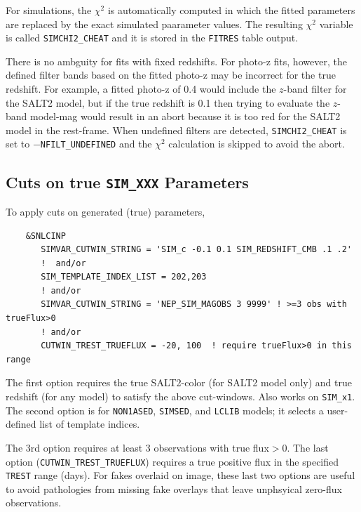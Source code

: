 \documentclass[12pt]{article}
\begin{document}
For simulations, the $\chi^2$ is automatically computed
in which the fitted parameters are replaced by the 
exact simulated paarameter values. The resulting $\chi^2$ variable
is called {\tt SIMCHI2\_CHEAT} and it is stored in the 
{\tt FITRES} table output.

There is no ambguity for fits with fixed redshifts.
For photo-z fits, however, the defined filter bands based
on the fitted photo-z may be incorrect for the true redshift.
For example, a fitted photo-z of 0.4 would include the
$z$-band filter for the SALT2 model, 
but if the true redshift is 0.1 then trying to evaluate
the $z$-band model-mag would result in an abort because
it is too red for the SALT2 model in the rest-frame.
When undefined filters are detected,
{\tt SIMCHI2\_CHEAT}  is set to $-${\tt NFILT\_UNDEFINED}
and the $\chi^2$ calculation is skipped to avoid the abort.


\subsection{Cuts on true {\tt SIM\_XXX} Parameters}
\label{subsec:SIMVAR_CUTS}

To apply cuts on generated (true) parameters,
\begin{verbatim}
    &SNLCINP
       SIMVAR_CUTWIN_STRING = 'SIM_c -0.1 0.1 SIM_REDSHIFT_CMB .1 .2'
       !  and/or
       SIM_TEMPLATE_INDEX_LIST = 202,203
       ! and/or
       SIMVAR_CUTWIN_STRING = 'NEP_SIM_MAGOBS 3 9999' ! >=3 obs with trueFlux>0
       ! and/or
       CUTWIN_TREST_TRUEFLUX = -20, 100  ! require trueFlux>0 in this range

\end{verbatim}
%
The first option requires the true SALT2-color (for SALT2 model only)
and true redshift (for any model) to satisfy
the above cut-windows.  Also works on {\tt SIM\_x1}.
The second option is for {\tt NON1ASED}, {\tt SIMSED}, and {\tt LCLIB}
models; it selects a user-defined list of template indices.

The 3rd option requires at least 3 observations with true flux$>0$.
The last option ({\tt CUTWIN\_TREST\_TRUEFLUX}) requires
a true positive flux in the specified {\tt TREST} range (days).
For fakes overlaid on image,  these last two options are useful 
to avoid pathologies from missing fake overlays that leave 
unphsyical zero-flux observations.
\end{document}
